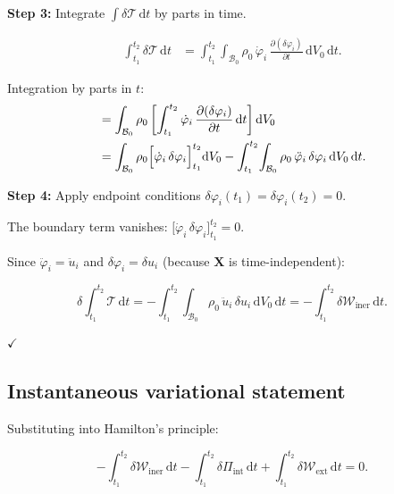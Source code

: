 \documentclass[11pt]{article}
\newcommand{\bX}{\mathbf{X}}
\newcommand{\bX}{\mathbf{X}}
\begin{document}
\textbf{Step 3:} Integrate $\int\delta\mathcal{T}\,\mathrm{d}t$
by parts in time.

\begin{align}
\int_{t_{1}}^{t_{2}}\!\delta\mathcal{T}\,\mathrm{d}t
&= \int_{t_{1}}^{t_{2}}\!\int_{\mathcal{B}_{0}}
   \rho_{0}\,\dot{\varphi}_{i}\,
   \frac{\partial(\delta\varphi_{i})}{\partial t}\,
   \mathrm{d}V_{0}\,\mathrm{d}t.
\end{align}

Integration by parts in $t$:
\begin{align}
&= \int_{\mathcal{B}_{0}}\rho_{0}
   \left[\int_{t_{1}}^{t_{2}}
   \dot{\varphi}_{i}\,
   \frac{\partial(\delta\varphi_{i})}{\partial t}\,
   \mathrm{d}t\right]\mathrm{d}V_{0}
\nonumber\\
&= \int_{\mathcal{B}_{0}}\rho_{0}
   \Bigl[\dot{\varphi}_{i}\,\delta\varphi_{i}\Bigr]_{t_{1}}^{t_{2}}
   \mathrm{d}V_{0}
   - \int_{t_{1}}^{t_{2}}\!\int_{\mathcal{B}_{0}}
   \rho_{0}\,\ddot{\varphi}_{i}\,\delta\varphi_{i}\,
   \mathrm{d}V_{0}\,\mathrm{d}t.
\end{align}

\textbf{Step 4:} Apply endpoint conditions
$\delta\varphi_{i}(t_{1})=\delta\varphi_{i}(t_{2})=0$.

The boundary term vanishes:
$\bigl[\dot{\varphi}_{i}\,\delta\varphi_{i}\bigr]_{t_{1}}^{t_{2}}=0$.

Since $\ddot{\varphi}_{i}=\ddot{u}_{i}$ and $\delta\varphi_{i}=\delta u_{i}$
(because $\bX$ is time-independent):

\begin{equation}
\delta\int_{t_{1}}^{t_{2}}\mathcal{T}\,\mathrm{d}t
= -\int_{t_{1}}^{t_{2}}\!\int_{\mathcal{B}_{0}}
  \rho_{0}\,\ddot{u}_{i}\,\delta u_{i}\,
  \mathrm{d}V_{0}\,\mathrm{d}t
= -\int_{t_{1}}^{t_{2}}\delta\mathcal{W}_{\mathrm{iner}}\,\mathrm{d}t.
\end{equation}

$\checkmark$

\subsection{Instantaneous variational statement}

Substituting into Hamilton's principle:

\begin{equation}
-\int_{t_{1}}^{t_{2}}\delta\mathcal{W}_{\mathrm{iner}}\,\mathrm{d}t
- \int_{t_{1}}^{t_{2}}\delta\Pi_{\mathrm{int}}\,\mathrm{d}t
+ \int_{t_{1}}^{t_{2}}\delta\mathcal{W}_{\mathrm{ext}}\,\mathrm{d}t
= 0.
\end{equation}
\end{document}
